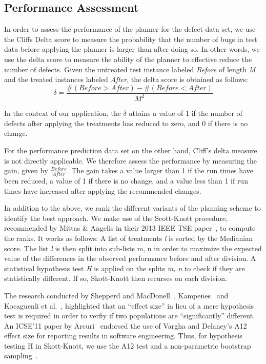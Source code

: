 \documentclass[conference]{IEEEtran}
\begin{document}
\subsection{Performance Assessment}

In order to assess the performance of the planner for the defect data set, we use the Cliffs Delta score to measure the probability that the number of bugs in test data before applying the planner is larger than after doing so. In other words, we use the delta score to measure the ability of the planner to effective reduce the number of defects. Given the untreated test instance labeled \textit{Before} of length \textit{M} and the treated instances labeled \textit{After}, the delta score is obtained as follows:
\begin{equation}
\delta = \frac{\#(Before>After) - \#(Before<After)}{M^2}
\end{equation}

In the context of our application, the $\delta$ attains a value of 1 if the number of defects after applying the treatments has reduced to zero, and 0 if there is no change.

For the performance prediction data set on the other hand, Cliff's delta measure is not directly applicable. We therefore assess the performance by measuring the gain, given by $\frac{Before}{After}$. The gain takes a value larger than 1 if the run times have been reduced, a value of 1 if there is no change, and a value less than 1 if run times have increased after applying the recommended changes. 

In addition to the above, we rank the different variants of the planning scheme to identify the best approach. We make use of the Scott-Knott procedure, recommended by Mittas \& Angelis in their 2013 IEEE TSE paper~\cite{sk}, to compute the ranks. It works as follows: A list of treatments \textit{l} is sorted by the Medianian score. The list \textit{l} is then split into sub-lists m, n in order to maximize the expected value of the differences in the observed performance before and after division. A statistical hypothesis test \textit{H} is applied on the splits \textit{m, n} to check if they are statistically different. If so, Skott-Knott then recurses on each division. 

The research conducted by Shepperd and MacDonell~\cite{shepperd12a}, Kampenes~\cite{kampenes07} and Kocaguenli et al.~\cite{}, highlighted that an ``effect size'' in lieu of a mere hypothesis test is required in order to verfiy if two populations are ``significantly'' different. An ICSE'11 paper by Arcuri~\cite{} endorsed the use of Vargha and Delaney's A12 effect size for reporting results in software engineering. Thus, for hypothesis testing H in Skott-Knott, we use the A12 test and a non-parametric bootstrap sampling~\cite{}.
\end{document}
